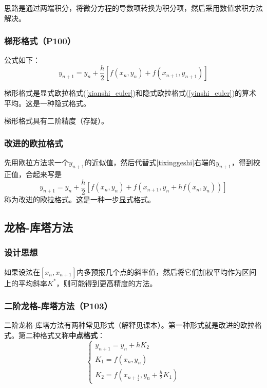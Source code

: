 \documentclass[fontset=ubuntu]{ctexart}
\numberwithin{equation}{section}
\numberwithin{theorem}{section}
\begin{document}
\begin{multicols}{2}
    思路是通过两端积分，将微分方程的导数项转换为积分项，然后采用数值求积方法解决。

    \subsubsection{梯形格式（P100）}

    公式如下：
    \begin{equation}
        \label{tixinggeshi}
        y_{n+1}=y_n+\frac{h}{2}\left[f(x_n,y_n)+f(x_{n+1},y_{n+1})\right]
    \end{equation}

    梯形格式是显式欧拉格式(\ref{xianshi_euler})和隐式欧拉格式(\ref{yinshi_euler})的算术平均。这是一种隐式格式。

    梯形格式具有二阶精度（存疑）。

    \subsubsection{改进的欧拉格式}

    先用欧拉方法求一个$y_{n+1}$的近似值，然后代替式\ref{tixinggeshi}右端的$y_{n+1}$，得到校正值，合起来写是
    \begin{equation}
        y_{n+1}=y_n+\frac{h}{2}\left[f(x_n,y_n)+f(x_{n+1},y_n+hf(x_n,y_n))\right]
    \end{equation}
    称为改进的欧拉格式。这是一种一步显式格式。

    \subsection{龙格-库塔方法}

    \subsubsection{设计思想}

    如果设法在$[x_n,x_{n+1}]$内多预报几个点的斜率值，然后将它们加权平均作为区间上的平均斜率$K^*$，则可能得到更高精度的方法。

    \subsubsection{二阶龙格-库塔方法（P103）}

    二阶龙格-库塔方法有两种常见形式（解释见课本）。第一种形式就是改进的欧拉格式。第二种格式又称\textbf{中点格式}：
    \begin{equation}
        \left\{\begin{array}{l}
            y_{n+1} = y_n+hK_2 \\
            K_1 = f(x_n,y_n) \\
            K_2 = f\left(x_{n+\frac{1}{2}},y_n+\frac{h}{2}K_1 \right )
        \end{array}\right.
    \end{equation}


\end{multicols}
\end{document}
